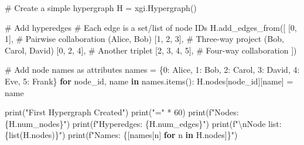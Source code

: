 \documentclass[
  11pt,
  letterpaper,
  oneside,
  openany]{book}
\newenvironment{Shaded}{\begin{snugshade}}{\end{snugshade}}
\newcommand{\BuiltInTok}[1]{\textcolor[rgb]{0.00,0.23,0.31}{#1}}
\newcommand{\CharTok}[1]{\textcolor[rgb]{0.13,0.47,0.30}{#1}}
\newcommand{\CommentTok}[1]{\textcolor[rgb]{0.37,0.37,0.37}{#1}}
\newcommand{\ControlFlowTok}[1]{\textcolor[rgb]{0.00,0.23,0.31}{\textbf{#1}}}
\newcommand{\DecValTok}[1]{\textcolor[rgb]{0.68,0.00,0.00}{#1}}
\newcommand{\KeywordTok}[1]{\textcolor[rgb]{0.00,0.23,0.31}{\textbf{#1}}}
\newcommand{\NormalTok}[1]{\textcolor[rgb]{0.00,0.23,0.31}{#1}}
\newcommand{\OperatorTok}[1]{\textcolor[rgb]{0.37,0.37,0.37}{#1}}
\newcommand{\SpecialCharTok}[1]{\textcolor[rgb]{0.37,0.37,0.37}{#1}}
\newcommand{\SpecialStringTok}[1]{\textcolor[rgb]{0.13,0.47,0.30}{#1}}
\newcommand{\StringTok}[1]{\textcolor[rgb]{0.13,0.47,0.30}{#1}}
\begin{document}
\begin{Shaded}
\begin{Highlighting}[]
\CommentTok{\# Create a simple hypergraph}
\NormalTok{H }\OperatorTok{=}\NormalTok{ xgi.Hypergraph()}

\CommentTok{\# Add hyperedges}
\CommentTok{\# Each edge is a set/list of node IDs}
\NormalTok{H.add\_edges\_from([}
\NormalTok{    [}\DecValTok{0}\NormalTok{, }\DecValTok{1}\NormalTok{],           }\CommentTok{\# Pairwise collaboration (Alice, Bob)}
\NormalTok{    [}\DecValTok{1}\NormalTok{, }\DecValTok{2}\NormalTok{, }\DecValTok{3}\NormalTok{],        }\CommentTok{\# Three{-}way project (Bob, Carol, David)}
\NormalTok{    [}\DecValTok{0}\NormalTok{, }\DecValTok{2}\NormalTok{, }\DecValTok{4}\NormalTok{],        }\CommentTok{\# Another triplet}
\NormalTok{    [}\DecValTok{2}\NormalTok{, }\DecValTok{3}\NormalTok{, }\DecValTok{4}\NormalTok{, }\DecValTok{5}\NormalTok{],     }\CommentTok{\# Four{-}way collaboration}
\NormalTok{])}

\CommentTok{\# Add node names as attributes}
\NormalTok{names }\OperatorTok{=}\NormalTok{ \{}\DecValTok{0}\NormalTok{: }\StringTok{\textquotesingle{}Alice\textquotesingle{}}\NormalTok{, }\DecValTok{1}\NormalTok{: }\StringTok{\textquotesingle{}Bob\textquotesingle{}}\NormalTok{, }\DecValTok{2}\NormalTok{: }\StringTok{\textquotesingle{}Carol\textquotesingle{}}\NormalTok{, }\DecValTok{3}\NormalTok{: }\StringTok{\textquotesingle{}David\textquotesingle{}}\NormalTok{, }\DecValTok{4}\NormalTok{: }\StringTok{\textquotesingle{}Eve\textquotesingle{}}\NormalTok{, }\DecValTok{5}\NormalTok{: }\StringTok{\textquotesingle{}Frank\textquotesingle{}}\NormalTok{\}}
\ControlFlowTok{for}\NormalTok{ node\_id, name }\KeywordTok{in}\NormalTok{ names.items():}
\NormalTok{    H.nodes[node\_id][}\StringTok{\textquotesingle{}name\textquotesingle{}}\NormalTok{] }\OperatorTok{=}\NormalTok{ name}

\BuiltInTok{print}\NormalTok{(}\StringTok{"First Hypergraph Created"}\NormalTok{)}
\BuiltInTok{print}\NormalTok{(}\StringTok{"="} \OperatorTok{*} \DecValTok{60}\NormalTok{)}
\BuiltInTok{print}\NormalTok{(}\SpecialStringTok{f"Nodes: }\SpecialCharTok{\{}\NormalTok{H}\SpecialCharTok{.}\NormalTok{num\_nodes}\SpecialCharTok{\}}\SpecialStringTok{"}\NormalTok{)}
\BuiltInTok{print}\NormalTok{(}\SpecialStringTok{f"Hyperedges: }\SpecialCharTok{\{}\NormalTok{H}\SpecialCharTok{.}\NormalTok{num\_edges}\SpecialCharTok{\}}\SpecialStringTok{"}\NormalTok{)}
\BuiltInTok{print}\NormalTok{(}\SpecialStringTok{f"}\CharTok{\textbackslash{}n}\SpecialStringTok{Node list: }\SpecialCharTok{\{}\BuiltInTok{list}\NormalTok{(H.nodes)}\SpecialCharTok{\}}\SpecialStringTok{"}\NormalTok{)}
\BuiltInTok{print}\NormalTok{(}\SpecialStringTok{f"Names: }\SpecialCharTok{\{}\NormalTok{[names[n] }\ControlFlowTok{for}\NormalTok{ n }\KeywordTok{in}\NormalTok{ H.nodes]}\SpecialCharTok{\}}\SpecialStringTok{"}\NormalTok{)}


\end{Highlighting}
\end{Shaded}
\end{document}
